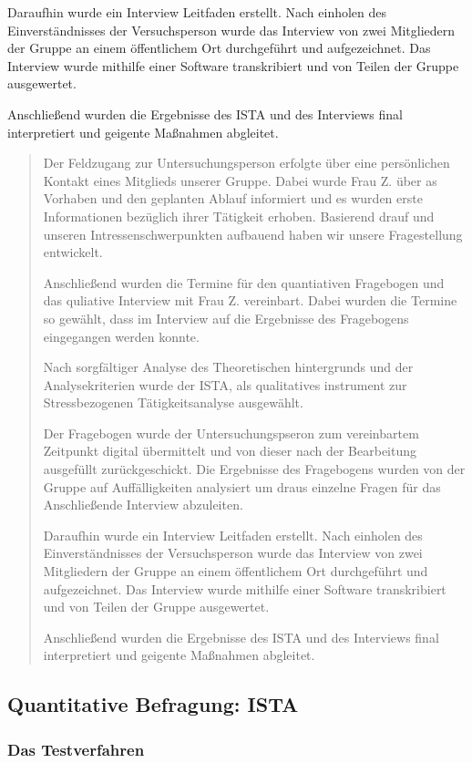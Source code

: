 \documentclass[12pt, a4paper]{article}
\begin{document}
Daraufhin wurde ein Interview Leitfaden erstellt. 
Nach einholen des Einverständnisses der Versuchsperson wurde das Interview von zwei Mitgliedern 
der Gruppe an einem öffentlichem Ort durchgeführt und aufgezeichnet. Das Interview wurde
mithilfe einer Software transkribiert und von Teilen der Gruppe ausgewertet. 

Anschließend wurden die Ergebnisse des ISTA und des Interviews final interpretiert und 
geigente Maßnahmen abgleitet. 

\blockquote{
\tiny
Der Feldzugang zur Untersuchungsperson erfolgte über eine persönlichen Kontakt eines Mitglieds 
unserer Gruppe. Dabei wurde Frau Z. über as Vorhaben und den geplanten Ablauf informiert und 
es wurden erste Informationen bezüglich ihrer Tätigkeit erhoben. Basierend drauf und 
unseren Intressenschwerpunkten aufbauend haben wir unsere Fragestellung entwickelt. 

Anschließend wurden die Termine für den quantiativen Fragebogen und das quliative Interview 
mit Frau Z. vereinbart. Dabei wurden die Termine so gewählt, dass im Interview auf die Ergebnisse 
des Fragebogens eingegangen werden konnte. 

Nach sorgfältiger Analyse des Theoretischen 
hintergrunds und der Analysekriterien wurde der ISTA, als qualitatives instrument zur 
Stressbezogenen Tätigkeitsanalyse ausgewählt.

Der Fragebogen wurde der Untersuchungspseron zum vereinbartem Zeitpunkt digital übermittelt und 
von dieser nach der Bearbeitung ausgefüllt zurückgeschickt. Die Ergebnisse des Fragebogens wurden 
von der Gruppe auf Auffälligkeiten analysiert um draus einzelne Fragen für das Anschließende 
Interview abzuleiten. 

Daraufhin wurde ein Interview Leitfaden erstellt. 
Nach einholen des Einverständnisses der Versuchsperson wurde das Interview von zwei Mitgliedern 
der Gruppe an einem öffentlichem Ort durchgeführt und aufgezeichnet. Das Interview wurde
mithilfe einer Software transkribiert und von Teilen der Gruppe ausgewertet. 

Anschließend wurden die Ergebnisse des ISTA und des Interviews final interpretiert und 
geigente Maßnahmen abgleitet. }


\subsection{Quantitative Befragung: ISTA}

\subsubsection*{Das Testverfahren}
\end{document}
